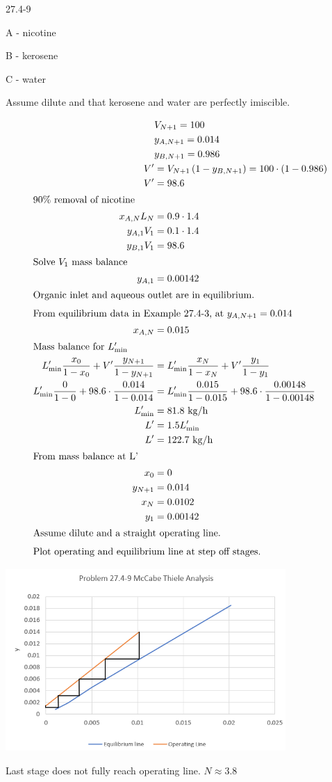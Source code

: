\item 27.4-9

A - nicotine

B - kerosene

C - water

Assume dilute and that kerosene and water are perfectly imiscible.

\begin{align*}
    & V_{N+1} = 100 \\
    & y_{A,N+1} = 0.014 \\ 
    & y_{B,N+1} = 0.986 \\ 
    V' &= V_{N+1} \left(1 - y_{B,N+1}\right) = 100 \cdot \left(1 - 0.986\right) \\
    V' &= 98.6 \\
    \intertext{90\% removal of nicotine}
    x_{A,N} L_N &= 0.9 \cdot 1.4 \\
    y_{A,1} V_1 &= 0.1 \cdot 1.4 \\
    y_{B,1} V_1 &= 98.6 \\
    \intertext{Solve $V_1$ mass balance}
    y_{A,1} &= 0.00142 \\
    \intertext{Organic inlet and aqueous outlet are in equilibrium.}
    \intertext{From equilibrium data in Example 27.4-3, at $y_{A,N+1}=0.014$}
    x_{A,N} &= 0.015 \\
    \intertext{Mass balance for $L'_{\text{min}}$}
    L'_{\text{min}} \frac{x_0}{1-x_0} + V' \frac{y_{N+1}}{1-y_{N+1}} &= L'_{\text{min}} \frac{x_N}{1-x_N} + V' \frac{y_1}{1-y_1} \\
    L'_{\text{min}} \frac{0}{1-0} + 98.6 \cdot \frac{0.014}{1-0.014} &= L'_{\text{min}} \frac{0.015}{1-0.015} + 98.6 \cdot \frac{0.00148}{1-0.00148} \\
    L'_{\text{min}} &= 81.8 \text{ kg/h} \\
    L' &= 1.5 L'_{\text{min}} \\
    L' &= 122.7 \text{ kg/h} \\
    \intertext{From mass balance at L'}
    x_0 &= 0 \\
    y_{N+1} &= 0.014 \\
    x_N &= 0.0102 \\
    y_1 &= 0.00142 \\
    \intertext{Assume dilute and a straight operating line.}
    \intertext{Plot operating and equilibrium line at step off stages.}
\end{align*}

\begin{center}
    \includegraphics[width=0.8\textwidth]{assets/p3.png}
\end{center}

Last stage does not fully reach operating line. $\boxed{N\approx3.8}$